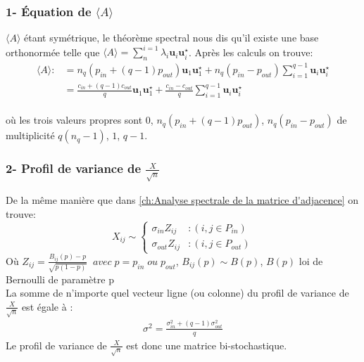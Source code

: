 \subsubsection*{1- Équation de $\langle A \rangle$}
$\langle A \rangle$ étant symétrique, le théorème spectral nous dis qu'il existe une base orthonormée telle que $\langle A \rangle = \sum_{n}^{i=1}\lambda_i\mathbf{u}_i\mathbf{u}_i^{\star}$.
Après les calculs on trouve:
\begin{align}\label{eq: A generalize}
\langle A \rangle :&= n_q(p_{in} + (q-1)p_{out}) \mathbf{u}_1\mathbf{u}_1^{\star} + n_q(p_{in}-p_{out})\sum_{i=1}^{q-1}\mathbf{u}_i\mathbf{u}_i^{\star}\\
				   &= \frac{c_{in} + (q-1)c_{out}}{q} \mathbf{u}_1\mathbf{u}_1^{\star} + \frac{c_{in}-c_{out}}{q}\sum_{i=1}^{q-1}\mathbf{u}_i\mathbf{u}_i^{\star}
\end{align}\\
où les trois valeurs propres sont $0$, $n_q(p_{in} + (q-1)p_{out})$, $n_q(p_{in}-p_{out})$ de multiplicité $q(n_q - 1)$, $1$, $q-1$.\\

\subsubsection*{2- Profil de variance de $\frac{X}{\sqrt{n}}$}
De la même manière que dans \autoref{ch:Analyse spectrale de la matrice d'adjacence} on trouve:
\begin{equation}
	X_{ij} \sim \left\{
	\begin{array}{lr}
		\sigma_{in} Z_{ij} & : (i,j \in P_{in}) \\
		\sigma_{out} Z_{ij} & : (i,j \in P_{out})
	\end{array}
\right.\nonumber
\end{equation}
Où $Z_{ij} = \frac{B_{ij}(p) - p}{\sqrt{p(1-p)}} \;\;avec \; p = p_{in} \; ou \; p_{out}$, $B_{ij}(p) \sim B(p)$, $B(p)$ loi de Bernoulli de paramètre p\\
La somme de n'importe quel vecteur ligne (ou colonne) du profil de variance de $\frac{X}{\sqrt{n}}$ est égale à : 
\begin{align}
\label{eq:sigma2} 
\sigma^2 = \frac{\sigma_{in}^2 + (q-1)\sigma_{out}^2}{q}
\end{align}
Le profil de variance de $\frac{X}{\sqrt{n}}$ est donc une matrice bi-stochastique.\\
